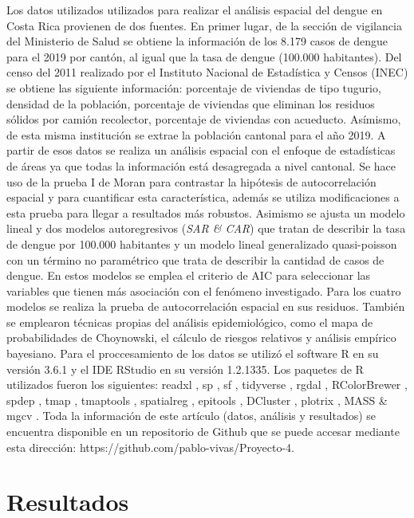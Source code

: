 \documentclass[12pt,a4paper]{article}
\begin{document}
Los datos utilizados utilizados para realizar el análisis espacial del dengue en Costa Rica provienen de dos fuentes. En primer lugar, de la sección de vigilancia del Ministerio de Salud se obtiene la información de los 8.179 casos de dengue para el 2019 por cantón, al igual que la tasa de dengue (100.000 habitantes). Del censo del 2011 realizado por el Instituto Nacional de Estadística y Censos (INEC) se obtiene las siguiente información: porcentaje de viviendas de tipo tugurio, densidad de la población, porcentaje de viviendas que eliminan los residuos sólidos por camión recolector, porcentaje de viviendas con acueducto. Asímismo, de esta misma institución se extrae la población cantonal para el año 2019.
\newline
A partir de esos datos se realiza un análisis espacial con el enfoque de estadísticas de áreas ya que todas la información está desagregada a nivel cantonal. Se hace uso de la prueba I de Moran para contrastar la hipótesis de autocorrelación espacial y para cuantificar esta característica, además se utiliza modificaciones a esta prueba para llegar a resultados más robustos. Asimismo se ajusta un modelo lineal y dos modelos autoregresivos (\textit{SAR \& CAR}) que tratan de describir la tasa de dengue por 100.000 habitantes y un modelo lineal generalizado quasi-poisson con un término no paramétrico que trata de describir la cantidad de casos de dengue. En estos modelos se emplea el criterio de AIC para seleccionar las variables que tienen más asociación con el fenómeno investigado. Para los cuatro modelos se realiza la prueba de autocorrelación espacial en sus residuos. También se emplearon técnicas propias del análisis epidemiológico, como el mapa de probabilidades de Choynowski, el cálculo de riesgos relativos y análisis empírico bayesiano.
\newline
Para el proccesamiento de los datos se utilizó el software R \cite{R} en su versión 3.6.1 y el IDE RStudio en su versión 1.2.1335. Los paquetes de R utilizados fueron los siguientes: readxl \cite{readxl}, sp \cite{sp}, sf \cite{sf}, tidyverse \cite{tidy}, rgdal \cite{rdal}, RColorBrewer \cite{Rcolor}, spdep \cite{sp}, tmap \cite{tmap}, tmaptools \cite{tmaptools}, spatialreg \cite{sp}, epitools \cite{epitools}, DCluster \cite{dcluster}, plotrix \cite{plotrix}, MASS \cite{MASS} \& mgcv \cite{mgcv}. Toda la información de este artículo (datos, análisis y resultados) se encuentra disponible en un repositorio de Github que se puede accesar mediante esta dirección: https://github.com/pablo-vivas/Proyecto-4.
\section{Resultados}
\end{document}
